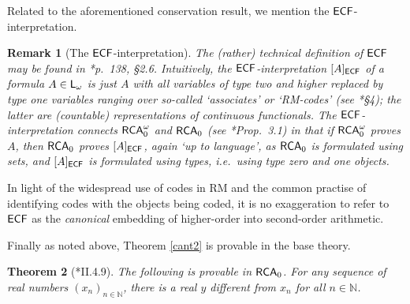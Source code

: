 \documentclass[reqno]{amsart}
\newtheorem{thm}{Theorem}
\newtheorem{rem}[thm]{Remark}
\def\RCA{\textup{\textsf{RCA}}}
\def\RCAo{\textup{\textsf{RCA}}_{0}^{\omega}}
\def\N{{\mathbb  N}}
\def\L{\textsf{\textup{L}}}
\def\ECF{\textup{\textsf{ECF}}}
\numberwithin{equation}{section}
\numberwithin{thm}{section}
\begin{document}
Related to the aforementioned conservation result, we mention the $\ECF$-interpretation. 
\begin{rem}[The $\ECF$-interpretation]\label{ECF}\rm
The (rather) technical definition of $\ECF$ may be found in \cite{troelstra1}*{p.\ 138, \S2.6}.
Intuitively, the $\ECF$-interpretation $[A]_{\ECF}$ of a formula $A\in \L_{\omega}$ is just $A$ with all variables 
of type two and higher replaced by type one variables ranging over so-called `associates' or `RM-codes' (see \cite{kohlenbach4}*{\S4}); the latter are (countable) representations of continuous functionals.  
The $\ECF$-interpretation connects $\RCAo$ and $\RCA_{0}$ (see \cite{kohlenbach2}*{Prop.\ 3.1}) in that if $\RCAo$ proves $A$, then $\RCA_{0}$ proves $[A]_{\ECF}$, again `up to language', as $\RCA_{0}$ is 
formulated using sets, and $[A]_{\ECF}$ is formulated using types, i.e.\ using type zero and one objects.  
\end{rem}
In light of the widespread use of codes in RM and the common practise of identifying codes with the objects being coded, it is no exaggeration to refer to $\ECF$ as the \emph{canonical} embedding of higher-order into second-order arithmetic. 

\smallskip

Finally as noted above, Theorem \ref{cant2} is provable in the base theory. 
\begin{thm}[\cite{simpson2}*{II.4.9}] The following is provable in $\RCA_{0}$.
For any sequence of real numbers $(x_{n})_{n\in \N}$, there is a real $y$ different from $x_{n}$ for all $n\in \N$.
\end{thm}
\end{document}
